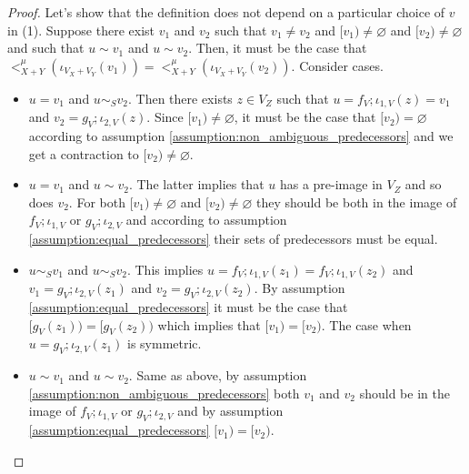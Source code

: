 \begin{proof}
    Let's show that the definition does not depend on a particular choice of $v$ in (1).
    Suppose there exist $v_1$ and $v_2$ such that $v_1 \not = v_2$ and $[v_1) \not = \varnothing$ and $[v_2) \not = \varnothing$ and such that $u \sim v_1$ and $u \sim v_2$.
    Then, it must be the case that $<_{X+Y}^{\mu}(\iota_{V_{X} + V_{Y}}(v_1)) = <_{X+Y}^{\mu}(\iota_{V_{X} + V_{Y}}(v_2))$.
    Consider cases.
    \begin{itemize}
        \item $u = v_1$ and $u \sim_{S} v_2$. Then there exists $z \in V_{Z}$ such that $u = f_{V};\iota_{1,V}(z) = v_1$ and $v_2 = g_{V};\iota_{2,V}(z)$.
              Since $[v_1) \not = \varnothing$, it must be the case that $[v_2) = \varnothing$ according to assumption \ref{assumption:non_ambiguous_predecessors} and we get a contraction to $[v_2) \not = \varnothing$.
        \item $u = v_1$ and $u \sim v_2$. The latter implies that $u$ has a pre-image in $V_{Z}$ and so does $v_2$.
              For both $[v_1) \not = \varnothing$ and $[v_2) \not = \varnothing$ they should be both in the image of $f_{V};\iota_{1,V}$ or $g_{V};\iota_{2,V}$ and according to assumption \ref{assumption:equal_predecessors} their sets of predecessors must be equal.
        \item $u \sim_{S} v_1$ and $u \sim_{S} v_2$. This implies $u = f_{V};\iota_{1,V}(z_1) = f_{V};\iota_{1,V}(z_2)$ and $v_{1} = g_{V};\iota_{2,V}(z_1)$ and $v_{2} = g_{V};\iota_{2,V}(z_2)$.
              By assumption \ref{assumption:equal_predecessors} it must be the case that $[g_{V}(z_1)) = [g_{V}(z_2))$ which implies that $[v_1) = [v_2)$.
              The case when $u = g_{V};\iota_{2,V}(z_1)$ is symmetric.
        \item $u \sim v_1$ and $u \sim v_2$. Same as above, by assumption \ref{assumption:non_ambiguous_predecessors} both $v_1$ and $v_2$ should be in the image of $f_{V};\iota_{1,V}$ or $g_{V};\iota_{2,V}$ and by assumption \ref{assumption:equal_predecessors} $[v_1) = [v_2)$.
    \end{itemize}


\end{proof}
